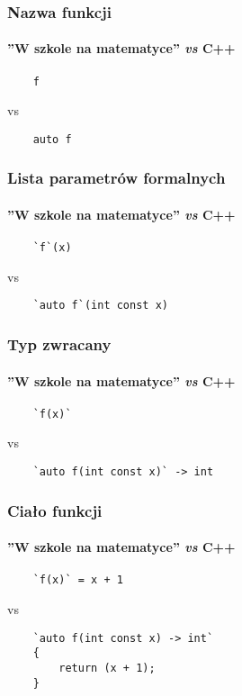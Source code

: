 \documentclass[aspectratio=169]{beamer}
\begin{document}

\begin{frame}[fragile]
    \frametitle{Nazwa funkcji}
    \framesubtitle{''W szkole na matematyce'' \emph{vs} C++}

    {\footnotesize
    \begin{lstlisting}
    f
    \end{lstlisting}}

    vs

    {\footnotesize
    \begin{lstlisting}
    auto f
    \end{lstlisting}}
    \vspace{3em}
\end{frame}

\begin{frame}[fragile]
    \frametitle{Lista parametrów formalnych}
    \framesubtitle{''W szkole na matematyce'' \emph{vs} C++}

    {\footnotesize
    \begin{lstlisting}
    `f`(x)
    \end{lstlisting}}

    vs

    {\footnotesize
    \begin{lstlisting}
    `auto f`(int const x)
    \end{lstlisting}}
    \vspace{3em}
\end{frame}

\begin{frame}[fragile]
    \frametitle{Typ zwracany}
    \framesubtitle{''W szkole na matematyce'' \emph{vs} C++}

    {\footnotesize
    \begin{lstlisting}
    `f(x)`
    \end{lstlisting}}

    vs

    {\footnotesize
    \begin{lstlisting}
    `auto f(int const x)` -> int
    \end{lstlisting}}
    \vspace{3em}
\end{frame}

\begin{frame}[fragile]
    \frametitle{Ciało funkcji}
    \framesubtitle{''W szkole na matematyce'' \emph{vs} C++}

    {\footnotesize
    \begin{lstlisting}
    `f(x)` = x + 1
    \end{lstlisting}}

    vs

    {\footnotesize
    \begin{lstlisting}
    `auto f(int const x) -> int`
    {
        return (x + 1);
    }
    \end{lstlisting}}
\end{frame}
\end{document}
